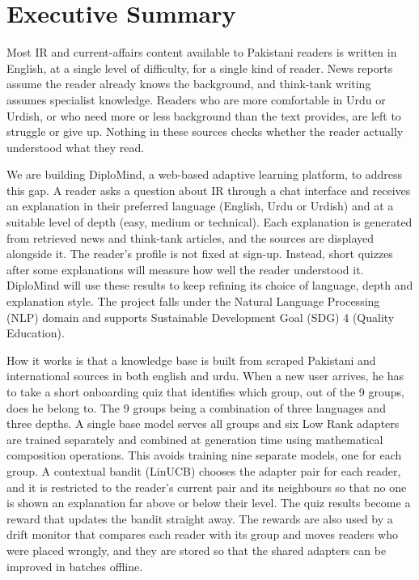 \documentclass{FastFyp}
\begin{document}
\section*{Executive Summary}
Most IR and current-affairs content available to Pakistani readers is written in English, at a single level of difficulty, for a single kind of reader. News reports assume the reader already knows the background, and think-tank writing assumes specialist knowledge. Readers who are more comfortable in Urdu or Urdish, or who need more or less background than the text provides, are left to struggle or give up. Nothing in these sources checks whether the reader actually understood what they read.

We are building DiploMind, a web-based adaptive learning platform, to address this gap. A reader asks a question about IR through a chat interface and receives an explanation in their preferred language (English, Urdu or Urdish) and at a suitable level of depth (easy, medium or technical). Each explanation is generated from retrieved news and think-tank articles, and the sources are displayed alongside it. The reader’s profile is not fixed at sign-up. Instead, short quizzes after some explanations will measure how well the reader understood it. DiploMind will use these results to keep refining its choice of language, depth and explanation style. The project falls under the Natural Language Processing (NLP) domain and supports Sustainable Development Goal (SDG) 4 (Quality Education).

How it works is that a knowledge base is built from scraped Pakistani and international sources in both english and urdu. When a new user arrives, he has to take a short onboarding quiz that identifies which group, out of the 9 groups, does he belong to. The 9 groups being a combination of three languages and three depths. A single base model serves all groups and six Low Rank adapters are trained separately and combined at generation time using mathematical composition operations. This avoids training nine separate models, one for each group. A contextual bandit (LinUCB) chooses the adapter pair for each reader, and it is restricted to the reader's current pair and its neighbours so that no one is shown an explanation far above or below their level. The quiz results become a reward that updates the bandit straight away. The rewards are also used by a drift monitor that compares each reader with its group and moves readers who were placed wrongly, and they are stored so that the shared adapters can be improved in batches offline.
\end{document}
